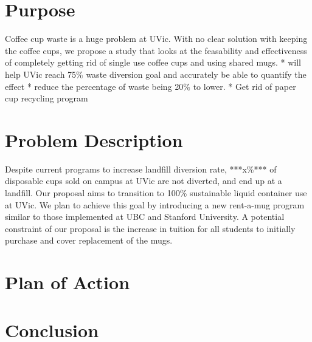 \documentclass[letterpaper,11pt]{texMemo} %
\begin{document}
\maketitle %


\section*{Purpose}
Coffee cup waste is a huge problem at UVic. With no clear solution with keeping the coffee cups, we propose a study that looks at the feasability and effectiveness of completely getting rid of single use coffee cups and using shared mugs.
* will help UVic reach 75\% waste diversion goal and accurately be able to quantify the effect
* reduce the percentage of waste being 20\% to lower.
* Get rid of paper cup recycling program
\section*{Problem Description}
Despite current programs to increase landfill diversion rate, ***x\%*** of
disposable cups sold on campus at UVic are not diverted, and end up at a landfill.
Our proposal aims to transition to 100\% sustainable liquid container use at UVic.
We plan to achieve this goal by introducing a new rent-a-mug program similar to
those implemented at UBC and Stanford University. A potential constraint of
our proposal is the increase in tuition for all students to initially purchase
and cover replacement of the mugs.

\section*{Plan of Action}

\section*{Conclusion}

\end{document}
